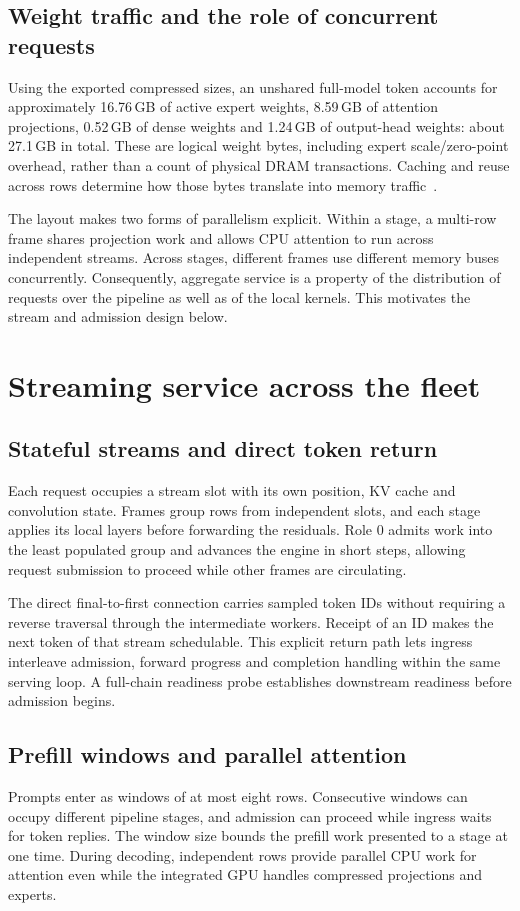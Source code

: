 \documentclass[11pt]{article}
\begin{document}
\subsection{Weight traffic and the role of concurrent requests}
Using the exported compressed sizes, an unshared full-model token accounts for approximately 16.76\,GB of active expert weights, 8.59\,GB of attention projections, 0.52\,GB of dense weights and 1.24\,GB of output-head weights: about 27.1\,GB in total. These are logical weight bytes, including expert scale/zero-point overhead, rather than a count of physical DRAM transactions. Caching and reuse across rows determine how those bytes translate into memory traffic~\cite{roofline}.

The layout makes two forms of parallelism explicit. Within a stage, a multi-row frame shares projection work and allows CPU attention to run across independent streams. Across stages, different frames use different memory buses concurrently. Consequently, aggregate service is a property of the distribution of requests over the pipeline as well as of the local kernels. This motivates the stream and admission design below.

\section{Streaming service across the fleet}
\label{sec:streaming}

\subsection{Stateful streams and direct token return}
Each request occupies a stream slot with its own position, KV cache and convolution state. Frames group rows from independent slots, and each stage applies its local layers before forwarding the residuals. Role 0 admits work into the least populated group and advances the engine in short steps, allowing request submission to proceed while other frames are circulating.

The direct final-to-first connection carries sampled token IDs without requiring a reverse traversal through the intermediate workers. Receipt of an ID makes the next token of that stream schedulable. This explicit return path lets ingress interleave admission, forward progress and completion handling within the same serving loop. A full-chain readiness probe establishes downstream readiness before admission begins.

\subsection{Prefill windows and parallel attention}
Prompts enter as windows of at most eight rows. Consecutive windows can occupy different pipeline stages, and admission can proceed while ingress waits for token replies. The window size bounds the prefill work presented to a stage at one time. During decoding, independent rows provide parallel CPU work for attention even while the integrated GPU handles compressed projections and experts.
\end{document}
